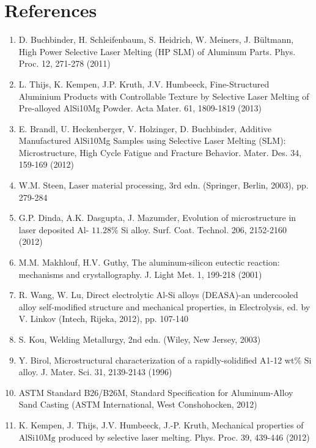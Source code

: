 \documentclass[10pt]{article}
\begin{document}
\section*{References}
\begin{enumerate}
  \item D. Buchbinder, H. Schleifenbaum, S. Heidrich, W. Meiners, J. Bültmann, High Power Selective Laser Melting (HP SLM) of Aluminum Parts. Phys. Proc. 12, 271-278 (2011)

  \item L. Thijs, K. Kempen, J.P. Kruth, J.V. Humbeeck, Fine-Structured Aluminium Products with Controllable Texture by Selective Laser Melting of Pre-alloyed AlSi10Mg Powder. Acta Mater. 61, 1809-1819 (2013)

  \item E. Brandl, U. Heckenberger, V. Holzinger, D. Buchbinder, Additive Manufactured AlSi10Mg Samples using Selective Laser Melting (SLM): Microstructure, High Cycle Fatigue and Fracture Behavior. Mater. Des. 34, 159-169 (2012)

  \item W.M. Steen, Laser material processing, 3rd edn. (Springer, Berlin, 2003), pp. 279-284

  \item G.P. Dinda, A.K. Dasgupta, J. Mazumder, Evolution of microstructure in laser deposited Al- $11.28 \%$ Si alloy. Surf. Coat. Technol. 206, 2152-2160 (2012)

  \item M.M. Makhlouf, H.V. Guthy, The aluminum-silicon eutectic reaction: mechanisms and crystallography. J. Light Met. 1, 199-218 (2001)

  \item R. Wang, W. Lu, Direct electrolytic Al-Si alloys (DEASA)-an undercooled alloy self-modified structure and mechanical properties, in Electrolysis, ed. by V. Linkov (Intech, Rijeka, 2012), pp. 107-140

  \item S. Kou, Welding Metallurgy, 2nd edn. (Wiley, New Jersey, 2003)

  \item Y. Birol, Microstructural characterization of a rapidly-solidified A1-12 wt\% Si alloy. J. Mater. Sci. 31, 2139-2143 (1996)

  \item ASTM Standard B26/B26M, Standard Specification for Aluminum-Alloy Sand Casting (ASTM International, West Conshohocken, 2012)

  \item K. Kempen, J. Thijs, J.V. Humbeeck, J.-P. Kruth, Mechanical properties of $\mathrm{AlSi10Mg}$ produced by selective laser melting. Phys. Proc. 39, 439-446 (2012)

\end{enumerate}
\end{document}

